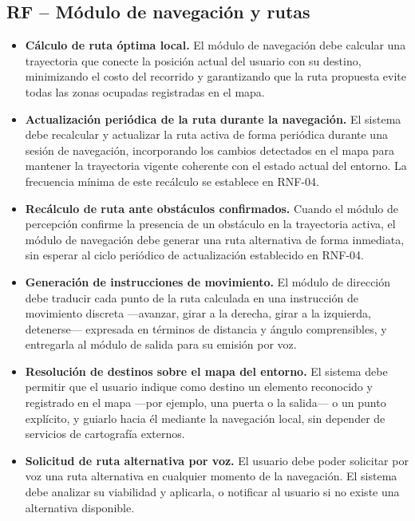 \subsection*{RF -- Módulo de navegación y rutas}

\begin{itemize}

    \item[\textbf{RF-18}] \textbf{Cálculo de ruta óptima local.}
    El módulo de navegación debe calcular una trayectoria que conecte la posición actual del
    usuario con su destino, minimizando el costo del recorrido y garantizando que la ruta
    propuesta evite todas las zonas ocupadas registradas en el mapa.

    \item[\textbf{RF-19}] \textbf{Actualización periódica de la ruta durante la navegación.}
    El sistema debe recalcular y actualizar la ruta activa de forma periódica durante una
    sesión de navegación, incorporando los cambios detectados en el mapa para mantener la
    trayectoria vigente coherente con el estado actual del entorno. La frecuencia mínima
    de este recálculo se establece en RNF-04.

    \item[\textbf{RF-20}] \textbf{Recálculo de ruta ante obstáculos confirmados.}
    Cuando el módulo de percepción confirme la presencia de un obstáculo en la trayectoria
    activa, el módulo de navegación debe generar una ruta alternativa de forma inmediata,
    sin esperar al ciclo periódico de actualización establecido en RNF-04.

    \item[\textbf{RF-21}] \textbf{Generación de instrucciones de movimiento.}
    El módulo de dirección debe traducir cada punto de la ruta calculada en una instrucción
    de movimiento discreta ---avanzar, girar a la derecha, girar a la izquierda,
    detenerse--- expresada en términos de distancia y ángulo comprensibles, y entregarla
    al módulo de salida para su emisión por voz.

    \item[\textbf{RF-22}] \textbf{Resolución de destinos sobre el mapa del entorno.}
    El sistema debe permitir que el usuario indique como destino un elemento reconocido y
    registrado en el mapa ---por ejemplo, una puerta o la salida--- o un punto explícito,
    y guiarlo hacia él mediante la navegación local, sin depender de servicios de
    cartografía externos.

    \item[\textbf{RF-23}] \textbf{Solicitud de ruta alternativa por voz.}
    El usuario debe poder solicitar por voz una ruta alternativa en cualquier momento de la
    navegación. El sistema debe analizar su viabilidad y aplicarla, o notificar al usuario
    si no existe una alternativa disponible.

\end{itemize}

